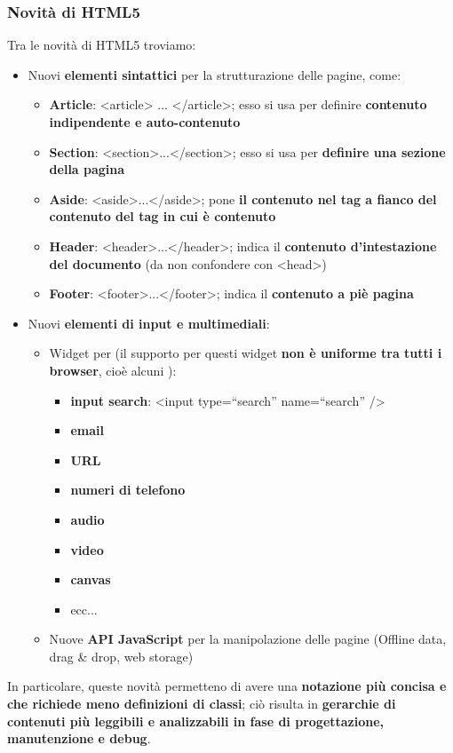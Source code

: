 \documentclass[12pt]{article}
\begin{document}
\subsubsection{Novità di HTML5}
Tra le novità di HTML5 troviamo:
\begin{itemize}
    \item Nuovi \textbf{elementi sintattici} per la strutturazione delle pagine, come:
    \begin{itemize}
        \item \textbf{Article}: <article> ... </article>; esso si usa per definire \textbf{contenuto indipendente e auto-contenuto}
        \item \textbf{Section}: <section>...</section>; esso si usa per \textbf{definire una sezione della pagina}
        \item \textbf{Aside}: <aside>...</aside>; pone \textbf{il contenuto nel tag a fianco del contenuto del tag in cui è contenuto}
        \item \textbf{Header}: <header>...</header>; indica il \textbf{contenuto d'intestazione del documento} (da non confondere con <head>)
        \item \textbf{Footer}: <footer>...</footer>; indica il \textbf{contenuto a piè pagina}
    \end{itemize}
    \item Nuovi \textbf{elementi di input e multimediali}:
    \begin{itemize}
        \item Widget per (il supporto per questi widget \textbf{non è uniforme tra tutti i browser}, cioè alcuni ):
        \begin{itemize}
            \item \textbf{input search}: <input type=“search” name=“search” />
            \item \textbf{email}
            \item \textbf{URL}
            \item \textbf{numeri di telefono}
            \item \textbf{audio}
            \item \textbf{video}
            \item \textbf{canvas}
            \item ecc...
        \end{itemize}
        \item Nuove \textbf{API JavaScript} per la manipolazione delle pagine (Offline data, drag \& drop, web storage)
    \end{itemize}
\end{itemize}
In particolare, queste novità permetteno di avere una \textbf{notazione più concisa e che richiede meno definizioni di classi}; ciò risulta in \textbf{gerarchie di contenuti più leggibili e analizzabili in fase di progettazione, manutenzione e debug}.
\end{document}
